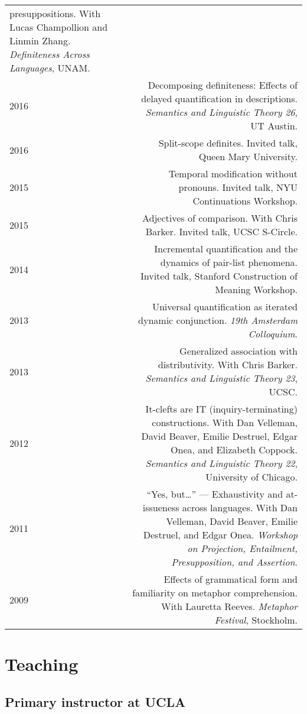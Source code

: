 \documentclass[12pt]{article}
\begin{document}
\begin{longtable}{LR}
         presuppositions.
         With Lucas Champollion and Linmin Zhang.
         \textit{Definiteness Across Languages}, UNAM.\\
  2016 & Decomposing definiteness: Effects of delayed quantification in
         descriptions.
         \textit{Semantics and Linguistic Theory 26}, UT Austin.\\
  2016 & Split-scope definites.
         Invited talk, Queen Mary University.\\
  2015 & Temporal modification without pronouns.
         Invited talk, NYU Continuations Workshop.\\
  2015 & Adjectives of comparison.
         With Chris Barker.
         Invited talk, UCSC S-Circle.\\
  2014 & Incremental quantification and the dynamics of pair-list phenomena.
         Invited talk, Stanford Construction of Meaning Workshop.\\
  2013 & Universal quantification as iterated dynamic conjunction.
         \textit{19th Amsterdam Colloquium}. \\
  2013 & Generalized association with distributivity.
         With Chris Barker.
         \textit{Semantics and Linguistic Theory 23}, UCSC.\\
  2012 & It-clefts are IT (inquiry-terminating) constructions.
         With Dan Velleman, David Beaver, Emilie Destruel, Edgar Onea, and
         Elizabeth Coppock.
         \textit{Semantics and Linguistic Theory 22}, University of Chicago.\\
  2011 & ``Yes, but\dots'' --- Exhaustivity and at-issueness across languages.
          With Dan Velleman, David Beaver, Emilie Destruel, and Edgar Onea.
          \textit{Workshop on Projection, Entailment, Presupposition, and
          Assertion}.\\
  2009 & Effects of grammatical form and familiarity on metaphor
         comprehension.
         With Lauretta Reeves.
         \textit{Metaphor Festival}, Stockholm.
\end{longtable}

\medskip

\section*{Teaching}

\subsection*{Primary instructor at UCLA}
\end{document}
